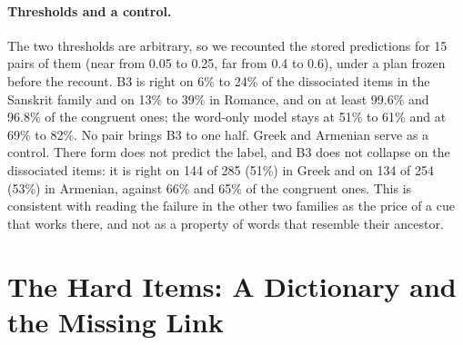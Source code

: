 \documentclass[11pt]{article}
\begin{document}
\paragraph{Thresholds and a control.} The two thresholds are arbitrary, so we recounted the stored predictions for 15 pairs of them (near from 0.05 to 0.25, far from 0.4 to 0.6), under a plan frozen before the recount. B3 is right on 6\% to 24\% of the dissociated items in the Sanskrit family and on 13\% to 39\% in Romance, and on at least 99.6\% and 96.8\% of the congruent ones; the word-only model stays at 51\% to 61\% and at 69\% to 82\%. No pair brings B3 to one half. Greek and Armenian serve as a control. There form does not predict the label, and B3 does not collapse on the dissociated items: it is right on 144 of 285 (51\%) in Greek and on 134 of 254 (53\%) in Armenian, against 66\% and 65\% of the congruent ones. This is consistent with reading the failure in the other two families as the price of a cue that works there, and not as a property of words that resemble their ancestor.

\section{The Hard Items: A Dictionary and the Missing Link}
\label{sec:link}
\end{document}
